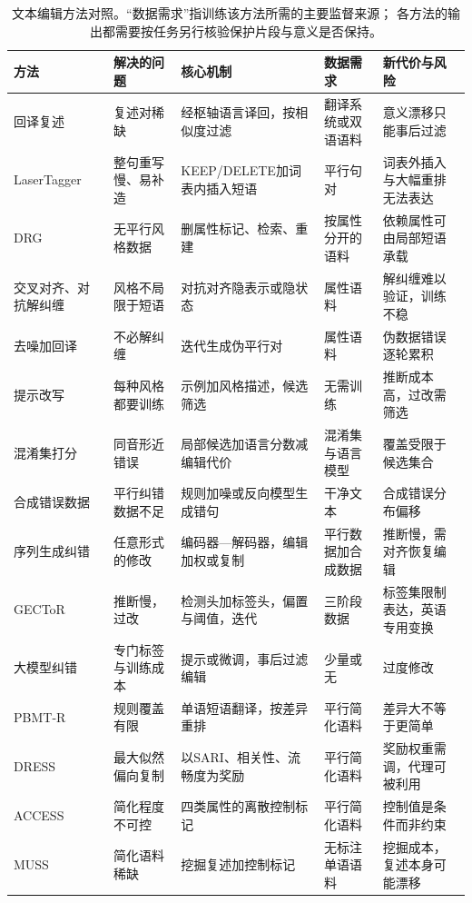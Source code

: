 \begin{table}[htbp]
  \centering
  \small
  \begin{tabularx}{\linewidth}{@{}>{\raggedright\arraybackslash}p{24mm}
    >{\raggedright\arraybackslash}p{30mm}>{\raggedright\arraybackslash}p{38mm}
    >{\raggedright\arraybackslash}p{30mm}>{\raggedright\arraybackslash}X@{}}
    \toprule
    方法 & 解决的问题 & 核心机制 & 数据需求 & 新代价与风险\\
    \midrule
    回译复述 & 复述对稀缺 & 经枢轴语言译回，按相似度过滤 & 翻译系统或双语语料 & 意义漂移只能事后过滤\\
    LaserTagger & 整句重写慢、易补造 & KEEP/DELETE加词表内插入短语 & 平行句对 & 词表外插入与大幅重排无法表达\\
    DRG & 无平行风格数据 & 删属性标记、检索、重建 & 按属性分开的语料 & 依赖属性可由局部短语承载\\
    交叉对齐、对抗解纠缠 & 风格不局限于短语 & 对抗对齐隐表示或隐状态 & 属性语料 & 解纠缠难以验证，训练不稳\\
    去噪加回译 & 不必解纠缠 & 迭代生成伪平行对 & 属性语料 & 伪数据错误逐轮累积\\
    提示改写 & 每种风格都要训练 & 示例加风格描述，候选筛选 & 无需训练 & 推断成本高，过改需筛选\\
    混淆集打分 & 同音形近错误 & 局部候选加语言分数减编辑代价 & 混淆集与语言模型 & 覆盖受限于候选集合\\
    合成错误数据 & 平行纠错数据不足 & 规则加噪或反向模型生成错句 & 干净文本 & 合成错误分布偏移\\
    序列生成纠错 & 任意形式的修改 & 编码器—解码器，编辑加权或复制 & 平行数据加合成数据 & 推断慢，需对齐恢复编辑\\
    GECToR & 推断慢，过改 & 检测头加标签头，偏置与阈值，迭代 & 三阶段数据 & 标签集限制表达，英语专用变换\\
    大模型纠错 & 专门标签与训练成本 & 提示或微调，事后过滤编辑 & 少量或无 & 过度修改\\
    PBMT-R & 规则覆盖有限 & 单语短语翻译，按差异重排 & 平行简化语料 & 差异大不等于更简单\\
    DRESS & 最大似然偏向复制 & 以SARI、相关性、流畅度为奖励 & 平行简化语料 & 奖励权重需调，代理可被利用\\
    ACCESS & 简化程度不可控 & 四类属性的离散控制标记 & 平行简化语料 & 控制值是条件而非约束\\
    MUSS & 简化语料稀缺 & 挖掘复述加控制标记 & 无标注单语语料 & 挖掘成本，复述本身可能漂移\\
    \bottomrule
  \end{tabularx}
  \caption{文本编辑方法对照。“数据需求”指训练该方法所需的主要监督来源；
  各方法的输出都需要按任务另行核验保护片段与意义是否保持。}
  \label{tab:nlp-generation-editing-methods}
\end{table}
\FloatBarrier
